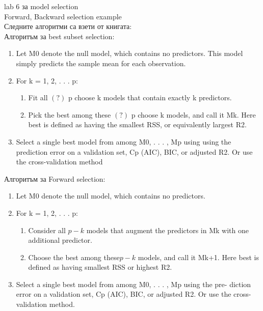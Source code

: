 \documentclass{article}
\begin{document}

	lab 6 за model selection \\
	Forward, Backward selection example \\
	Следните алгоритми са взети от книгата: \\
	Алгоритъм за best subset selection: 
	\begin{enumerate}
		\item Let M0 denote the null model, which contains no predictors. This
		model simply predicts the sample mean for each observation.
		\item For k = 1, 2, . . . p: 
			\begin{enumerate}
				\item Fit all $(?)$ p choose k models that contain exactly k predictors.
				\item Pick the best among these  $(?)$ p choose k models, and call it Mk. Here best
				is defined as having the smallest RSS, or equivalently largest R2.
			\end{enumerate}
		\item Select a single best model from among M0, . . . , Mp using using the
		prediction error on a validation set, Cp (AIC), BIC, or adjusted R2.
		Or use the cross-validation method
	\end{enumerate}
	
	Алгоритъм за Forward selection: 
	\begin{enumerate}
				\item Let M0 denote the null model, which contains no predictors.
		\item For k = 1, 2, . . . p: 
		\begin{enumerate}
			\item Consider all $p-k$   models that augment the predictors in Mk
			with one additional predictor.
			\item Choose the best among these$p-k$    models, and call it Mk+1.
			Here best is defined as having smallest RSS or highest R2.
		\end{enumerate}
		\item Select a single best model from among M0, . . . , Mp using the pre-
		diction error on a validation set, Cp (AIC), BIC, or adjusted R2. Or
		use the cross-validation method.
	\end{enumerate}
	
\end{document}
